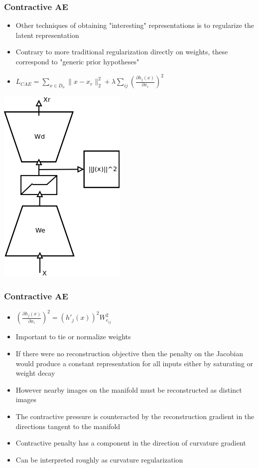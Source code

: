 \documentclass{beamer}
\begin{document}
\begin{frame} 
\frametitle{Contractive AE}
\begin{itemize}
\item{Other techniques of obtaining "interesting" representations is to regularize the latent representation}
\item{Contrary to more traditional regularization directly on weights, these correspond to "generic prior hypotheses"}
\item{$L_{CAE} = \sum_{x \in D_n} \|x-x_r\|_2 ^2 + \lambda \sum_{ij} \left(\frac{\partial h_j(x)}{\partial x_i} \right)^2$ }
\end{itemize} 
\begin{center}
\includegraphics[scale = 0.4]{CAE.png} 
\end{center} 
\end{frame} 

\begin{frame}
\frametitle{Contractive AE} 
\begin{itemize}
\item{$\left(\frac{\partial h_j(x)}{\partial x_i}\right)^2 = (h'_j(x))^2 W_{e_{ij}}^2$}
\item{Important to tie or normalize weights}
\item{If there were no reconstruction objective then the penalty on the Jacobian would produce a constant representation for all inputs either by saturating or weight decay} 
\item{However nearby images on the manifold must be reconstructed as distinct images}
\item{The contractive pressure is counteracted by the reconstruction gradient in the directions tangent to the manifold}
\item{Contractive penalty has a component in the direction of curvature gradient}
\item{Can be interpreted roughly as curvature regularization}
\end{itemize} 
\end{frame} 
\end{document}
